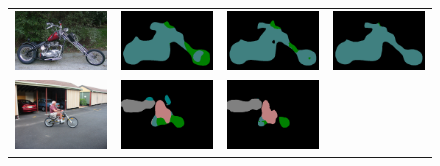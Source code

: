 \begin{figure}
  \centering
  \begin{tabular}{c c c c}
    \includegraphics[width=0.21\linewidth]{fig/spm/img/2010_003947.jpg} &
    \includegraphics[width=0.21\linewidth]{fig/spm/vgg128_noup_pool3_20M_largewin3_newcode5/post_none/2010_003947.png} &
    \includegraphics[width=0.21\linewidth]{fig/spm/vgg128_noup_pool3_40M_largewin_spm_2/post_none/2010_003947.png} &    
    \includegraphics[width=0.21\linewidth]{fig/spm/vgg128_noup_pool3_40M_largewin_spm_3/post_none/2010_003947.png} \\
    \includegraphics[width=0.21\linewidth]{fig/spm/img/2010_003446.jpg} &
    \includegraphics[width=0.21\linewidth]{fig/spm/vgg128_noup_pool3_20M_largewin3_newcode5/post_none/2010_003446.png} &
    \includegraphics[width=0.21\linewidth]{fig/spm/vgg128_noup_pool3_40M_largewin_spm_2/post_none/2010_003446.png} &    

\end{tabular}
\end{figure}

